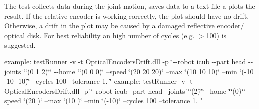 The test collects data during the joint motion, saves data to a text file a plots the result. If the relative encoder is working correctly, the plot should have no drift. Otherwise, a drift in the plot may be caused by a damaged reflective encoder/ optical disk. For best reliability an high number of cycles (e.\-g. $>$100) is suggested.

example\-: test\-Runner -\/v -\/t Optical\-Encoders\-Drift.\-dll -\/p \char`\"{}-\/-\/robot icub -\/-\/part head -\/-\/joints \char`\"{}\char`\"{}(0 1 2)\char`\"{}\char`\"{} -\/-\/home \char`\"{}\char`\"{}(0 0 0)\char`\"{} --speed \char`\"{}(20 20 20)\char`\"{} --max \char`\"{}(10 10 10)\char`\"{} --min \char`\"{}(-\/10 -\/10 -\/10)\char`\"{} --cycles 100 --tolerance 1. \char`\"{}
example\-: test\-Runner -\/v -\/t Optical\-Encoders\-Drift.\-dll -\/p \char`\"{}--robot icub --part head --joints \char`\"{}\char`\"{}(2)\char`\"{}\char`\"{} --home \char`\"{}\char`\"{}(0)\char`\"{}\char`\"{} --speed \char`\"{}(20      )\char`\"{} --max \char`\"{}(10      )\char`\"{} --min \char`\"{}(-\/10)\char`\"{} --cycles 100 --tolerance 1. "

